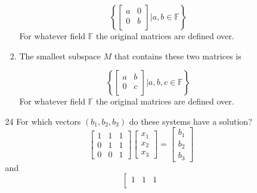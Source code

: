 \documentclass[12pt,letterpaper]{article}
\begin{document}
\begin{enumerate}[label=\S 2.\arabic*]
\begin{enumerate}
\begin{enumerate}
              \[
                \left\{
                  \begin{bmatrix}
                    a & 0 \\
                    0 & b \\
                  \end{bmatrix}
                  |
                  a, b \in \mathbb{F}
                \right\}
              \]
              For whatever field $\mathbb{F}$ the original matrices are defined over.
            \item
              The smallest subspace $M$ that contains these two matrices is

              \[
                \left\{
                  \begin{bmatrix}
                    a & b \\
                    0 & c \\
                  \end{bmatrix}
                  |
                  a, b, c \in \mathbb{F}
                \right\}
              \]
              For whatever field $\mathbb{F}$ the original matrices are defined over.
          \end{enumerate}
        \item [24]
          For which vectors $(b_1, b_2, b_3)$ do these systems have a solution?
          \[
            \left[
            \begin{array}{ccc}
              1 & 1 & 1  \\
              0 & 1 & 1  \\
              0 & 0 & 1
            \end{array}
            \right]
            \left[
            \begin{array}{c}
              x_1 \\
              x_2 \\
              x_3
            \end{array}
            \right]
            =
            \left[
            \begin{array}{c}
              b_1 \\
              b_2 \\
              b_3
            \end{array}
            \right]
            \tag{1}\label{eq:1}
          \]
          and
          \[
            \left[
            \begin{array}{ccc}
              1 & 1 & 1  \\

\end{array}\]
\end{enumerate}
\end{enumerate}
\end{document}
